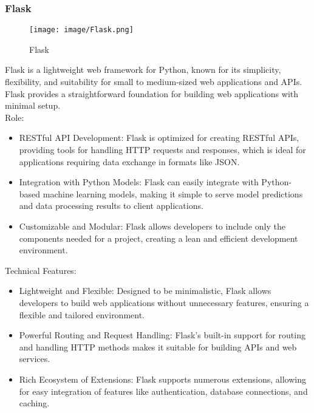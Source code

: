 \documentclass[conference]{IEEEtran}
\begin{document}
\subsubsection{Flask}
\begin{figure}[h!]
    \centering
    \texttt{[image: image/Flask.png]}
    \caption{Flask}
    \label{fig:enter-label}
\end{figure}

\noindent Flask is a lightweight web framework for Python, known for its simplicity, flexibility, and suitability for small to medium-sized web applications and APIs. Flask provides a straightforward foundation for building web applications with minimal setup.\\

Role:
\begin{itemize}
    \item RESTful API Development: Flask is optimized for creating RESTful APIs, providing tools for handling HTTP requests and responses, which is ideal for applications requiring data exchange in formats like JSON.\\
    \item Integration with Python Models: Flask can easily integrate with Python-based machine learning models, making it simple to serve model predictions and data processing results to client applications.\\
    \item Customizable and Modular: Flask allows developers to include only the components needed for a project, creating a lean and efficient development environment.\\
\end{itemize}

Technical Features:
\begin{itemize}
    \item Lightweight and Flexible: Designed to be minimalistic, Flask allows developers to build web applications without unnecessary features, ensuring a flexible and tailored environment.\\
    \item Powerful Routing and Request Handling: Flask’s built-in support for routing and handling HTTP methods makes it suitable for building APIs and web services.\\
    \item Rich Ecosystem of Extensions: Flask supports numerous extensions, allowing for easy integration of features like authentication, database connections, and caching.\\
\end{itemize}
\end{document}
